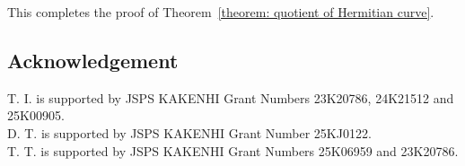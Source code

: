 \documentclass[12pt,a4paper]{amsart}
\theoremstyle{definition}
\theoremstyle{remark}
\begin{document}
This completes the proof of Theorem~\ref{theorem: quotient of Hermitian curve}. 

 
  



 

 

\subsection*{Acknowledgement} 
T. I. is supported by JSPS KAKENHI Grant Numbers 23K20786, 24K21512 and 25K00905.\\
D. T. is supported by JSPS KAKENHI Grant Number 25KJ0122.\\
T. T. is supported by JSPS KAKENHI Grant Numbers 25K06959 and 23K20786.
\end{document}
